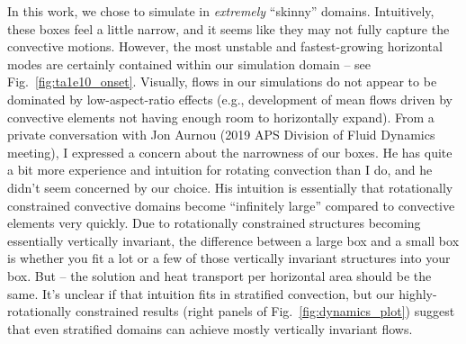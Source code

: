 In this work, we chose to simulate in \emph{extremely} ``skinny'' domains.
Intuitively, these boxes feel a little narrow, and it seems like they may not fully capture the convective motions.
However, the most unstable and fastest-growing horizontal modes are certainly contained within our simulation domain -- see Fig.~\ref{fig:ta1e10_onset}. 
Visually, flows in our simulations do not appear to be dominated by low-aspect-ratio effects (e.g., development of mean flows driven by convective elements not having enough room to horizontally expand).
From a private conversation with Jon Aurnou (2019 APS Division of Fluid Dynamics meeting), I expressed a concern about the narrowness of our boxes.
He has quite a bit more experience and intuition for rotating convection than I do, and he didn't seem concerned by our choice.
His intuition is essentially that rotationally constrained convective domains become ``infinitely large'' compared to convective elements very quickly.
Due to rotationally constrained structures becoming essentially vertically invariant, the difference between a large box and a small box is whether you fit a lot or a few of those vertically invariant structures into your box.
But -- the solution and heat transport per horizontal area should be the same.
It's unclear if that intuition fits in stratified convection, but our highly-rotationally constrained results (right panels of Fig.~\ref{fig:dynamics_plot}) suggest that even stratified domains can achieve mostly vertically invariant flows.
